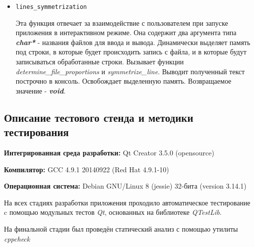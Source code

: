 \documentclass[12pt,a4paper]{report}
\begin{document}
\begin{enumerate}
\begin{itemize}
\item \verb-lines_symmetrization-

Эта функция отвечает за взаимодействие с пользователем при запуске приложения в интерактивном режиме. Она содержит два аргумента типа \textbf{\textit{char*} }- названия файлов для ввода и вывода.  Динамически выделяет память под строки, в которые будет происходить запись с файла, и в которые будут записываться обработанные строки. Вызывает функции \textit{determine\_file\_proportions} и \textit{symmetrize\_line}. Выводит полученный текст построчно в консоль. Освобождает выделенную память. Возвращаемое значение - \textit{\textbf{void}}.
\end{itemize}


\end{enumerate}
\subsection{Описание тестового стенда и методики тестирования}

\begin{flushleft}
\textbf{Интегрированная среда разработки:} Qt Creator 3.5.0 (opensource)

\textbf{Компилятор:} GCC 4.9.1 20140922 (Red Hat 4.9.1-10)

\textbf{Операционная система:} Debian GNU/Linux 8 (jessie) 32-бита (version 3.14.1)
\end{flushleft}

На всех стадиях разработки приложения проходило автоматическое тестирование c помощью модульных тестов \textit{Qt}, основанных на библиотеке  \textit{QTestLib}.

На финальной стадии был проведён статический анализ с помощью утилиты \textit{cppcheck}%
\end{document}
